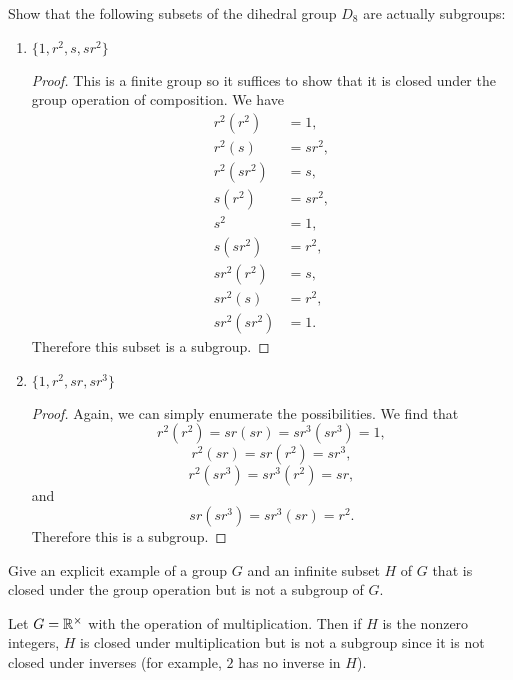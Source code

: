  Show that the following subsets of the dihedral group $D_8$
are actually subgroups:
\begin{enumerate}
\item $\{1,r^2,s,sr^2\}$
  \begin{proof}
    This is a finite group so it suffices to show that it is closed
    under the group operation of composition. We have
    \begin{align*}
      r^2(r^2) &= 1, \\
      r^2(s) &= sr^2, \\
      r^2(sr^2) &= s, \\
      s(r^2) &= sr^2, \\
      s^2 &= 1, \\
      s(sr^2) &= r^2, \\
      sr^2(r^2) &= s, \\
      sr^2(s) &= r^2, \\
      sr^2(sr^2) &= 1.
    \end{align*}
    Therefore this subset is a subgroup.
  \end{proof}
\item $\{1,r^2,sr,sr^3\}$
  \begin{proof}
    Again, we can simply enumerate the possibilities. We find that
    \begin{equation*}
      r^2(r^2) = sr(sr) = sr^3(sr^3) = 1,
    \end{equation*}
    \begin{equation*}
      r^2(sr) = sr(r^2) = sr^3,
    \end{equation*}
    \begin{equation*}
      r^2(sr^3) = sr^3(r^2) = sr,
    \end{equation*}
    and
    \begin{equation*}
      sr(sr^3) = sr^3(sr) = r^2.
    \end{equation*}
    Therefore this is a subgroup.
  \end{proof}
\end{enumerate}

 Give an explicit example of a group $G$ and an infinite
subset $H$ of $G$ that is closed under the group operation but is not
a subgroup of $G$.
\begin{solution}
  Let $G = \mathbb{R}^\times$ with the operation of multiplication. Then if
  $H$ is the nonzero integers, $H$ is closed under multiplication but
  is not a subgroup since it is not closed under inverses (for
  example, $2$ has no inverse in $H$).
\end{solution}

